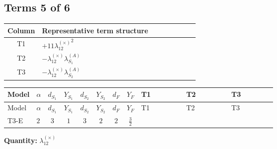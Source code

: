 \documentclass[8pt]{article}
\begin{document}
\begin{landscape}
\subsection*{Terms 5 of 6}
\begin{center}
\begin{tabular}{@{}c >{\raggedright\arraybackslash}p{0.82\linewidth}@{}}
\toprule
Column & Representative term structure \\
\midrule
T1 & \(\displaystyle +11 {\lambda_{12}^{(\times)}}^2\) \\
\midrule
T2 & \(\displaystyle -{\lambda_{12}^{(\times)}} {\lambda_{S_1}^{(A)}}\) \\
\midrule
T3 & \(\displaystyle -{\lambda_{12}^{(\times)}} {\lambda_{S_2}^{(A)}}\) \\
\midrule
\bottomrule
\end{tabular}
\end{center}
\smallskip
\tiny
\begin{longtable}{@{}llcccccc >{\raggedright\arraybackslash}p{0.21\linewidth} >{\raggedright\arraybackslash}p{0.21\linewidth} >{\raggedright\arraybackslash}p{0.21\linewidth}@{}}
\toprule
Model & $\alpha$ & $d_{S_1}$ & $Y_{S_1}$ & $d_{S_2}$ & $Y_{S_2}$ & $d_F$ & $Y_F$ & T1 & T2 & T3 \\
\midrule
\endfirsthead
\toprule
Model & $\alpha$ & $d_{S_1}$ & $Y_{S_1}$ & $d_{S_2}$ & $Y_{S_2}$ & $d_F$ & $Y_F$ & T1 & T2 & T3 \\
\midrule
\endhead
T3-E & $2$ & $3$ & $1$ & $3$ & $2$ & $2$ & $\frac{3}{2}$ & \scriptsize\adjustbox{max width=\linewidth}{$\begin{gathered} +11 {\lambda_{12}^{(\times)}}^2\end{gathered}$} & \scriptsize\adjustbox{max width=\linewidth}{$\begin{gathered} -{\lambda_{12}^{(\times)}} {\lambda_{S_1}^{(A)}}\end{gathered}$} & \scriptsize\adjustbox{max width=\linewidth}{$\begin{gathered} -{\lambda_{12}^{(\times)}} {\lambda_{S_2}^{(A)}}\end{gathered}$} \\
\midrule
\bottomrule
\end{longtable}
\clearpage
\noindent\textbf{Quantity: }$\lambda_{12}^{(\times)}$\par\smallskip

\end{landscape}
\end{document}
